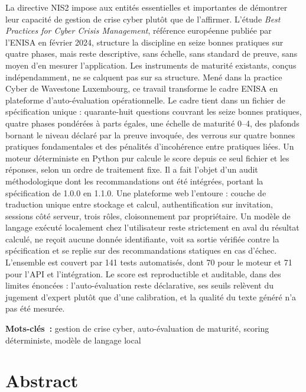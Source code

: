 \documentclass[english]{tnreport}
\begin{document}
La directive NIS2 impose aux entités essentielles et importantes de démontrer
leur capacité de gestion de crise cyber plutôt que de l'affirmer. L'étude
\emph{Best Practices for Cyber Crisis Management}, référence européenne publiée
par l'ENISA en février 2024, structure la discipline en seize bonnes pratiques
sur quatre phases, mais reste descriptive, sans échelle, sans standard de
preuve, sans moyen d'en mesurer l'application. Les instruments de maturité
existants, conçus indépendamment, ne se calquent pas sur sa structure. Mené dans
la practice Cyber de Wavestone Luxembourg, ce travail transforme le
cadre ENISA en plateforme d'auto-évaluation opérationnelle. Le cadre tient dans
un fichier de spécification unique : quarante-huit questions couvrant les seize
bonnes pratiques, quatre phases pondérées à parts égales, une échelle de
maturité 0--4, des plafonds bornant le niveau déclaré par la preuve invoquée,
des verrous sur quatre bonnes pratiques fondamentales et des pénalités
d'incohérence entre pratiques liées. Un moteur déterministe en Python pur
calcule le score depuis ce seul fichier et les réponses, selon un ordre de
traitement fixe. Il a fait l'objet d'un audit méthodologique dont les
recommandations ont été intégrées, portant la spécification de 1.0.0 en 1.1.0. Une
plateforme web l'entoure : couche de traduction unique entre stockage et calcul,
authentification sur invitation, sessions côté serveur, trois rôles,
cloisonnement par propriétaire. Un modèle de langage exécuté localement chez
l'utilisateur reste strictement en aval du résultat calculé, ne reçoit aucune
donnée identifiante, voit sa sortie vérifiée contre la spécification et se
replie sur des recommandations statiques en cas d'échec. L'ensemble est couvert
par 141 tests automatisés, dont 70 pour le moteur et 71 pour l'API et
l'intégration. Le score est reproductible et auditable, dans des limites
énoncées : l'auto-évaluation reste déclarative, ses seuils relèvent du jugement
d'expert plutôt que d'une calibration, et la qualité du texte généré n'a pas été
mesurée.

  {\bf Mots-clés~:} gestion de crise cyber, auto-évaluation de maturité,
  scoring déterministe, modèle de langage local


\clearpage 
\thispagestyle{empty}
\section*{Abstract}
\end{document}
